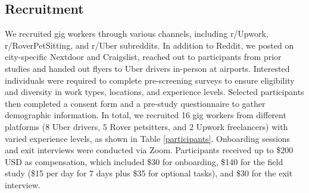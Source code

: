 \subsection{Recruitment}
We recruited gig workers through various channels, including r/Upwork, r/RoverPetSitting, and r/Uber subreddits. In addition to Reddit, we posted on city-specific Nextdoor and Craigslist, reached out to participants from prior studies and handed out flyers to Uber drivers in-person at airports. 
Interested individuals were required to complete pre-screening surveys to ensure eligibility and diversity in work types, locations, and experience levels. 
Selected participants then completed a consent form and a pre-study questionnaire to gather demographic information.
In total, we recruited 16 gig workers from different platforms (8 Uber drivers, 5 Rover petsitters, and 2 Upwork freelancers) with varied experience levels, as shown in Table \ref{participants}. Onboarding sessions and exit interviews were conducted via Zoom. Participants received up to \$200 USD as compensation, which included \$30 for onboarding, \$140 for the field study (\$15 per day for 7 days plus \$35 for optional tasks), and \$30 for the exit interview.



